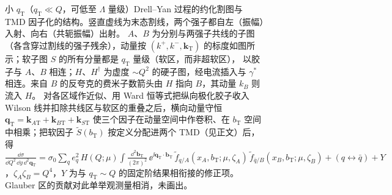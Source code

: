 \begin{figure}[htbp]
\begin{tikzpicture}[fd,
  t3 hadron/.style={draw=black!70,line width=1.5pt,line cap=butt},
  t3 lab/.style={font=\small},
  t3 note/.style={font=\footnotesize}]
\end{tikzpicture}
\caption{小 $q_{\mathrm T}$（$q_{\mathrm T}\ll Q$，可低至 $\Lambda$ 量级）Drell--Yan 过程的约化割图与 TMD 因子化的结构。竖直虚线为末态割线，两个强子都自左（振幅）入射、向右（共轭振幅）出射。
$A$、$B$ 为分别与两强子共线的子图（各含穿过割线的强子残余），动量按 $(k^+,k^-,\boldsymbol k_{\mathrm T})$ 的标度如图所示；软子图 $S$ 的所有分量都是 $q_{\mathrm T}$ 量级（软区，而非超软区），
以胶子与 $A$、$B$ 相连；$H$、$H^\dagger$ 为虚度 $\sim Q^2$ 的硬子图，经电流插入与 $\gamma^*$ 相连。来自 $B$ 的反夸克的费米子数箭头由 $H$ 指向 $B$，其动量 $k_B$ 则流入 $H$。
对各区域作近似、用 Ward 恒等式把纵向极化胶子收入 Wilson 线并扣除共线区与软区的重叠之后，横向动量守恒 $\boldsymbol q_{\mathrm T}=\boldsymbol k_{A\mathrm T}+\boldsymbol k_{B\mathrm T}+\boldsymbol k_{S\mathrm T}$ 使三个因子在动量空间中作卷积、在 $b_{\mathrm T}$ 空间中相乘；把软因子 $\tilde S(b_{\mathrm T})$ 按定义分配进两个 TMD（见正文）后，得
$\frac{\dd\sigma}{\dd Q^2\,\dd y\,\dd^2\boldsymbol q_{\mathrm T}}=\sigma_0\sum_q e_q^2\,H(Q;\mu)\int\frac{\dd^2\boldsymbol b_{\mathrm T}}{(2\pi)^2}\,\ee^{\ii\boldsymbol q_{\mathrm T}\cdot\boldsymbol b_{\mathrm T}}\,
\tilde f_{q/A}(x_A,b_{\mathrm T};\mu,\zeta_A)\,\tilde f_{\bar q/B}(x_B,b_{\mathrm T};\mu,\zeta_B)+(q\leftrightarrow\bar q)+Y$，$\zeta_A\zeta_B=Q^4$，$Y$ 为与 $q_{\mathrm T}\sim Q$ 的固定阶结果相衔接的修正项。
Glauber 区的贡献对此单举观测量相消，未画出。}
\label{fig:tmd-dy}
\end{figure}

